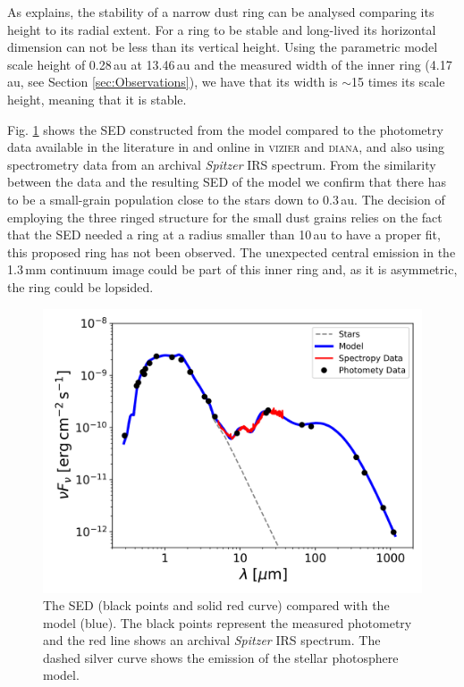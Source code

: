 \documentclass[letters,usenatbib,times]{mnras}
\begin{document}
As \citet{2018ApJ...869L..46D} explains, the stability of a narrow dust ring can be analysed comparing its height to its radial extent. For a ring to be stable and long-lived its horizontal dimension can not be less than its vertical height. Using the parametric model scale height of 0.28\,au at 13.46\,au and the measured width of the inner ring (4.17\,au, see Section \ref{sec:Observations}), we have that its width is $\sim$15 times its scale height, meaning that it is stable.

Fig. \ref{fig:SED} shows the SED constructed from the model compared to the photometry data available in the literature in \citet{Jensen_97} and online in \textsc{vizier} and \textsc{diana}, and also using spectrometry data from an archival \textit{Spitzer} IRS spectrum. From the similarity between the data and the resulting SED of the model we confirm that there has to be a small-grain population close to the stars down to 0.3\,au. The decision of employing the three ringed structure for the small dust grains relies on the fact that the SED needed a ring at a radius smaller than 10\,au to have a proper fit, this proposed ring has not been observed. The unexpected central emission in the 1.3\,mm continuum image could be part of this inner ring and, as it is asymmetric, the ring could be lopsided.

\begin{figure}
	\centering
	\includegraphics[width=\columnwidth]{SED_.png}
    \caption{The SED (black points and solid red curve) compared with the model (blue). The black points represent the measured photometry and the red line shows an archival \textit{Spitzer} IRS spectrum. The dashed silver curve shows the emission of the stellar photosphere model.}
    \label{fig:SED}
\end{figure}
\end{document}
